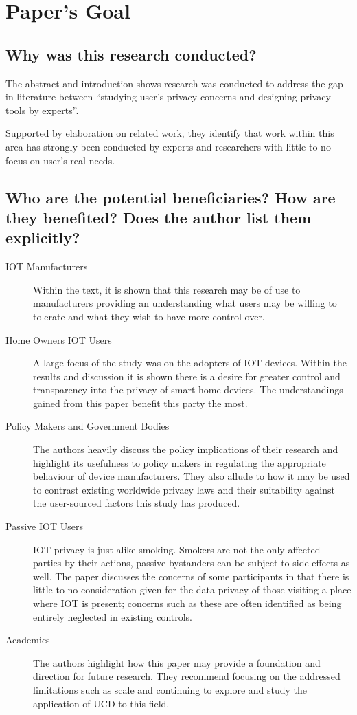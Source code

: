 \section{Paper's Goal}
\subsection{Why was this research conducted?}

The abstract and introduction shows research was conducted to address the gap in literature between ``studying user's privacy concerns and designing privacy tools by experts''.

Supported by elaboration on related work, they identify that work within this area has strongly been conducted by experts and researchers with little to no focus on user's real needs. 
\subsection{Who are the potential beneficiaries? How are they benefited? Does the author list them explicitly?}

\begin{description}
	\item[IOT Manufacturers] Within the text, it is shown that this research may be of use to manufacturers providing an understanding what users may be willing to tolerate and what they wish to have more control over.
	
	\item[Home Owners IOT Users] A large focus of the study was on the adopters of IOT devices. Within the results and discussion it is shown there is a desire for greater control and transparency into the privacy of smart home devices. The understandings gained from this paper benefit this party the most.
	
	\item[Policy Makers and Government Bodies] The authors heavily discuss the policy implications of their research and highlight its usefulness to policy makers in regulating the appropriate behaviour of device manufacturers. They also allude to how it may be used to contrast existing worldwide privacy laws and their suitability against the user-sourced factors this study has produced. 
	
	\item[Passive IOT Users] IOT privacy is just alike smoking. Smokers are not the only affected parties by their actions, passive bystanders can be subject to side effects as well. The paper discusses the concerns of some participants in that there is little to no consideration given for the data privacy of those visiting a place where IOT is present; concerns such as these are often identified as being entirely neglected in existing controls.
	
	\item[Academics] The authors highlight how this paper may provide a foundation and direction for future research. They recommend focusing on the addressed limitations such as scale and continuing to explore and study the application of UCD to this field.
\end{description}

